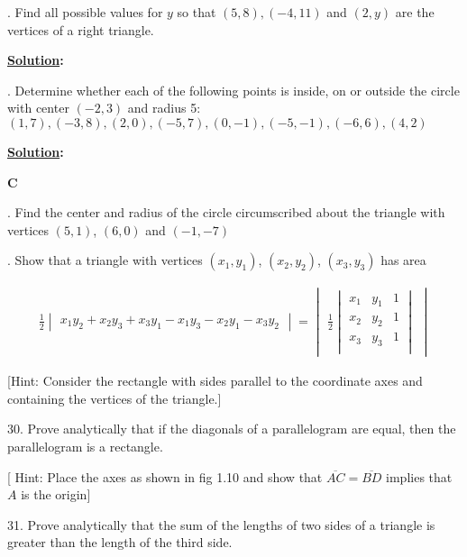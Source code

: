 \documentclass[10pt,letterpaper]{article}
\begin{document}
. Find all possible values for $y$ so that $(5,8), (-4,11)$ and $(2,y)$ are the vertices of a right triangle.

\smallskip
\textbf{\color{blue}\underline {Solution}:}

. Determine whether each of the following points is inside, on or outside the circle with center $(-2, 3)$ and radius 5: $(1,7), (-3,8), (2,0), (-5,7), (0,-1), (-5,-1), (-6,6), (4,2)$

\smallskip
\textbf{\color{blue}\underline {Solution}:}

\bigskip
\textbf{C}

. Find the center and radius of the circle circumscribed about the triangle with vertices $(5,1)$, $(6,0)$ and $(-1, -7)$


. Show that a triangle with vertices $(x_1, y_1)$, $(x_2,y_2)$, $(x_3, y_3)$ has area 

\begin{align}
\frac{1}{2}
\begin{vmatrix}
x_1y_2 +x_2y_3 +x_3y_1 - x_1y_3 -x_2y_1 -x_3y_2
\end{vmatrix}
= 
 \begin{vmatrix}
 \frac{1}{2}
 \begin{vmatrix}
 x_1 & y_1 & 1\\
 x_2 & y_2 & 1\\
 x_3 & y_3 & 1\\
 \end{vmatrix}
 \end{vmatrix}
\end{align}

{}[Hint: Consider the rectangle with sides parallel to the coordinate axes and containing the vertices of the triangle.]

30. Prove analytically that if the diagonals of a parallelogram are equal, then the parallelogram is a rectangle.

{}[ Hint: Place the axes as shown in fig 1.10 and show that $\overline{AC} = \overline{BD}$ implies that $A$ is the origin]

31. Prove analytically that the sum of the lengths of two sides of a triangle is greater than the length of the third side.
\end{document}
